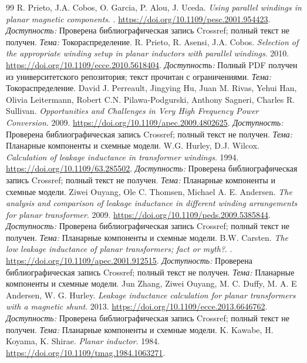 \documentclass[14pt,a4paper]{extarticle}
\begin{document}
\begin{thebibliography}{99}
R. Prieto, J.A. Cobos, O. Garcia, P. Alou, J. Uceda. \textit{Using parallel windings in planar magnetic components}. .
\url{https://doi.org/10.1109/pesc.2001.954423}.
\textit{Доступность:} Проверена библиографическая запись Crossref; полный текст не получен. \textit{Тема:} Токораспределение.
R. Prieto, R. Asensi, J.A. Cobos. \textit{Selection of the appropriate winding setup in planar inductors with parallel windings}. 2010.
\url{https://doi.org/10.1109/ecce.2010.5618404}.
\textit{Доступность:} Полный PDF получен из университетского репозитория; текст прочитан с ограничениями. \textit{Тема:} Токораспределение.
David J. Perreault, Jingying Hu, Juan M. Rivas, Yehui Han, Olivia Leitermann, Robert C.N. Pilawa-Podgurski, Anthony Sagneri, Charles R. Sullivan. \textit{Opportunities and Challenges in Very High Frequency Power Conversion}. 2009.
\url{https://doi.org/10.1109/apec.2009.4802625}.
\textit{Доступность:} Проверена библиографическая запись Crossref; полный текст не получен. \textit{Тема:} Планарные компоненты и схемные модели.
W.G. Hurley, D.J. Wilcox. \textit{Calculation of leakage inductance in transformer windings}. 1994.
\url{https://doi.org/10.1109/63.285502}.
\textit{Доступность:} Проверена библиографическая запись Crossref; полный текст не получен. \textit{Тема:} Планарные компоненты и схемные модели.
Ziwei Ouyang, Ole C. Thomsen, Michael A. E. Andersen. \textit{The analysis and comparison of leakage inductance in different winding arrangements for planar transformer}. 2009.
\url{https://doi.org/10.1109/peds.2009.5385844}.
\textit{Доступность:} Проверена библиографическая запись Crossref; полный текст не получен. \textit{Тема:} Планарные компоненты и схемные модели.
B.W. Carsten. \textit{The low leakage inductance of planar transformers; fact or myth?}. .
\url{https://doi.org/10.1109/apec.2001.912515}.
\textit{Доступность:} Проверена библиографическая запись Crossref; полный текст не получен. \textit{Тема:} Планарные компоненты и схемные модели.
Jun Zhang, Ziwei Ouyang, M. C. Duffy, M. A. E Andersen, W. G. Hurley. \textit{Leakage inductance calculation for planar transformers with a magnetic shunt}. 2013.
\url{https://doi.org/10.1109/ecce.2013.6646762}.
\textit{Доступность:} Проверена библиографическая запись Crossref; полный текст не получен. \textit{Тема:} Планарные компоненты и схемные модели.
K. Kawabe, H. Koyama, K. Shirae. \textit{Planar inductor}. 1984.
\url{https://doi.org/10.1109/tmag.1984.1063271}.

\end{thebibliography}
\end{document}
